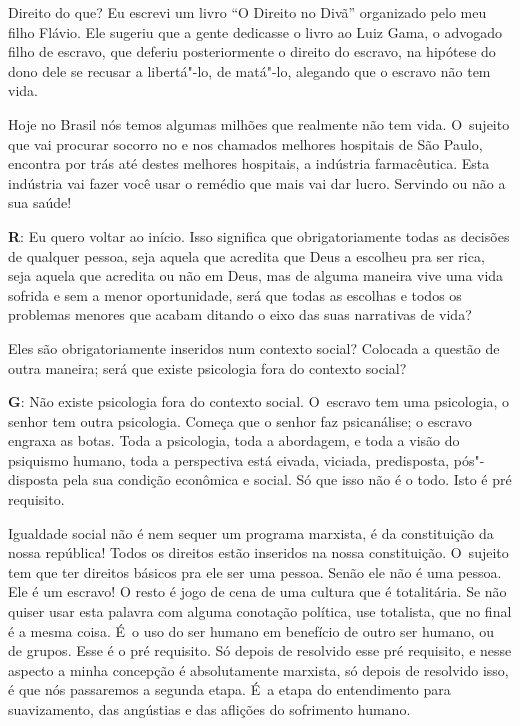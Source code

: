  

Direito do que? Eu escrevi um livro ``O Direito no Divã'' organizado
pelo meu filho Flávio. Ele sugeriu que a gente dedicasse o livro ao Luiz
Gama, o advogado filho de escravo, que deferiu posteriormente o direito
do escravo, na hipótese do dono dele se recusar a libertá"-lo, de
matá"-lo, alegando que o escravo não tem vida.

 

Hoje no Brasil nós temos algumas milhões que realmente não tem vida. O~sujeito que vai procurar socorro no  e nos chamados melhores
hospitais de São Paulo, encontra por trás até destes melhores hospitais,
a indústria farmacêutica. Esta indústria vai fazer você usar o remédio
que mais vai dar lucro. Servindo ou não a sua saúde!

 

\textbf{R}: Eu quero voltar ao início. Isso significa que
obrigatoriamente todas as decisões de qualquer pessoa, seja aquela que
acredita que Deus a escolheu pra ser rica, seja aquela que acredita ou
não em Deus, mas de alguma maneira vive uma vida sofrida e sem a menor
oportunidade, será que todas as escolhas e todos os problemas menores
que acabam ditando o eixo das suas narrativas de vida?

 

Eles são obrigatoriamente inseridos num contexto social? Colocada a
questão de outra maneira; será que existe psicologia fora do contexto
social?

 

\textbf{G}: Não existe psicologia fora do contexto social. O~escravo tem
uma psicologia, o senhor tem outra psicologia. Começa que o senhor faz
psicanálise; o escravo engraxa as botas. Toda a psicologia, toda a
abordagem, e toda a visão do psiquismo humano, toda a perspectiva está
eivada, viciada, predisposta, pós"-disposta pela sua condição econômica e
social. Só que isso não é o todo. Isto é pré requisito.

 

Igualdade social não é nem sequer um programa marxista, é da
constituição da nossa república! Todos os direitos estão inseridos na
nossa constituição. O~sujeito tem que ter direitos básicos pra ele ser
uma pessoa. Senão ele não é uma pessoa. Ele é um escravo! O resto é jogo
de cena de uma cultura que é totalitária. Se não quiser usar esta
palavra com alguma conotação política, use totalista, que no final é a
mesma coisa. É~o uso do ser humano em benefício de outro ser humano, ou
de grupos. Esse é o pré requisito. Só depois de resolvido esse pré
requisito, e nesse aspecto a minha concepção é absolutamente marxista,
só depois de resolvido isso, é que nós passaremos a segunda etapa. É~a
etapa do entendimento para suavizamento, das angústias e das aflições do
sofrimento humano.

